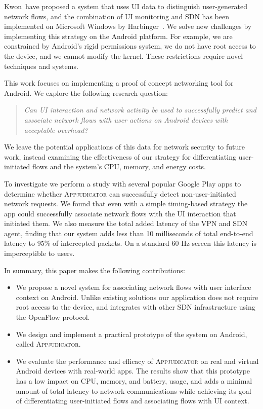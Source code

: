 Kwon~\etal have proposed a system that uses UI data to distinguish
user-generated network flows, and the combination of UI monitoring and SDN has
been implemented on Microsoft Windows by Harbinger~\cite{chuluundorj2019}.  We
solve new challenges by implementing this strategy on the Android platform. For
example, we are constrained by Android's rigid permissions system, we do not
have root access to the device, and we cannot modify the kernel. These
restrictions require novel techniques and systems.

This work focuses on implementing a proof of concept networking tool for
Android. We explore the following research question:
\begin{quote}
	\textit{Can UI interaction and network activity be used to successfully
		predict and associate network flows with user actions on Android devices
		with acceptable overhead?}
\end{quote}
We leave the potential applications of this data for network security to future
work, instead examining the effectiveness of our strategy for differentiating
user-initiated flows and the system's CPU, memory, and energy costs.

To investigate we perform a study with several popular Google Play apps to
determine whether \textsc{Appjudicator} can successfully detect
non-user-initiated network requests. We found that even with a simple
timing-based strategy the app could successfully associate network flows with
the UI interaction that initiated them. We also measure the total added latency
of the VPN and SDN agent, finding that our system adds less than 10 milliseconds
of total end-to-end latency to 95\% of intercepted packets. On a standard 60 Hz
screen this latency is imperceptible to users.

In summary, this paper makes the following contributions:

\begin{itemize}
	\item We propose a novel system for associating network flows with user
		interface context on Android. Unlike existing solutions our application
		does not require root access to the device, and integrates with other
		SDN infrastructure using the OpenFlow protocol.
	\item We design and implement a practical prototype of the system on
		Android, called \textsc{Appjudicator}.
	\item We evaluate the performance and efficacy of \textsc{Appjudicator} on
		real and virtual Android devices with real-world apps. The results show
		that this prototype has a low impact on CPU, memory, and battery, usage,
		and adds a minimal amount of total latency to network communications
		while achieving its goal of differentiating user-initiated flows and
		associating flows with UI context.
\end{itemize}

\newpage
